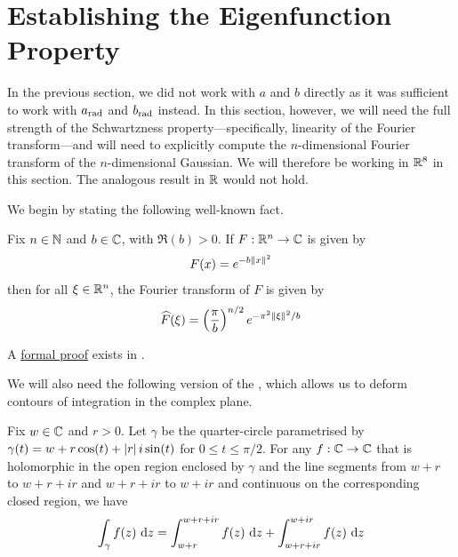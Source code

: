 \section{Establishing the Eigenfunction Property}
\label{Ch4:Sec:Eig}


In the previous section, we did not work with $a$ and $b$ directly as it was sufficient to work with $a_{\operatorname{rad}}$ and $b_{\operatorname{rad}}$ instead. In this section, however, we will need the full strength of the Schwartzness property---specifically, linearity of the Fourier transform---and will need to explicitly compute the $n$-dimensional Fourier transform of the $n$-dimensional Gaussian. We will therefore be working in $\mathbb{R}^8$ in this section. The analogous result in $\mathbb{R}$ would not hold.

We begin by stating the following well-known fact.
\begin{boxtheorem}\label{Ch4:Thm:GaussianFourier}
    Fix $n \in \mathbb{N}$ and $b \in \mathbb{C}$, with $\Re(b) > 0$. If $F : \mathbb{R}^n \to \mathbb{C}$ is given by
    \begin{align*}
        F(x) = e^{-b \left\lVert x \right\rVert^2}
    \end{align*}
    then for all $\xi \in \mathbb{R}^n$, the Fourier transform of $F$ is given by
    \begin{align*}
        \widehat{F}\!\left( \xi \right) = \left( \frac{\pi}{b} \right)^{{n} / {2}} e^{{- \pi^2 \left\lVert \xi \right\rVert^2} / {b}}
    \end{align*}
\end{boxtheorem}
A \href{https://github.com/leanprover-community/mathlib4/blob/5a2eaa85c555c4263e15928cef249cbaad2eb2d2/Mathlib/Analysis/SpecialFunctions/Gaussian/FourierTransform.lean#L360-L363}{formal proof} exists in \mathlib.

We will also need the following version of the \CGT, which allows us to deform contours of integration in the complex plane.

\begin{boxtheorem}\label{Ch4:Thm:CGTRectCircle}
    Fix $w \in \mathbb{C}$ and $r > 0$. Let $\gamma$ be the quarter-circle parametrised by $\gamma(t) = w + r\cos\!{\left( t \right)} + \left\lvert r \right\rvert i \sin\!{\left( t \right)}$ for $0 \leq t \leq \pi/2$. For any $f : \mathbb{C} \to \mathbb{C}$ that is holomorphic in the open region enclosed by $\gamma$ and the line segments from $w + r$ to $w + r + ir$ and $w + r + ir$ to $w + ir$ and continuous on the corresponding closed region, we have
    \begin{align*}
        \int_{\gamma} f(z) \, \operatorname{d}\!{z}
        = \int_{w + r}^{w + r + ir} f(z) \, \operatorname{d}\!{z} + \int_{w + r + ir}^{w + ir} f(z) \, \operatorname{d}\!{z}
    \end{align*}
\end{boxtheorem}

